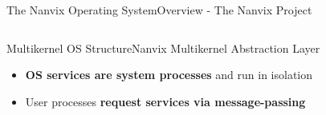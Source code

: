 \begin{frame}[fragile]{The Nanvix Operating System}{Overview - The Nanvix Project}
\begin{columns}[totalwidth=\linewidth]
\begin{columns}[totalwidth=\linewidth]
			\end{columns}


			\begin{center}
			\end{center}

		\end{columns}

		\end{frame}

		\begin{frame}[fragile]{Multikernel OS Structure}{Nanvix Multikernel Abstraction Layer}

			\begin{itemize}
				\item \textbf{OS services are system processes} and run in isolation
			\end{itemize}
			\begin{itemize}
				\item User processes \textbf{request services via message-passing}
			\end{itemize}


		\end{frame}

